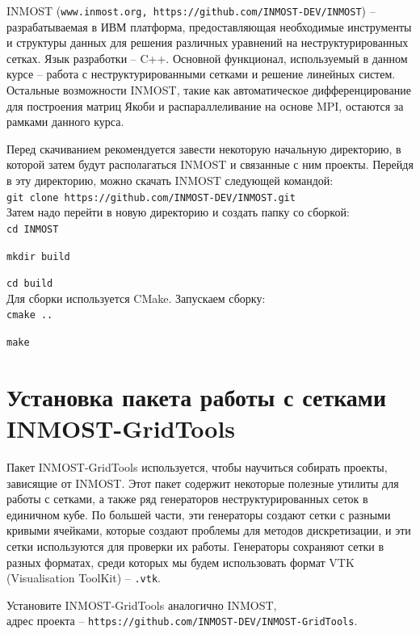 \documentclass[a4paper, 11pt]{article}
\begin{document}
INMOST (\texttt{www.inmost.org, https://github.com/INMOST-DEV/INMOST}) -- разрабатываемая в ИВМ платформа, предоставляющая необходимые инструменты и структуры данных для решения различных уравнений на неструктурированных сетках. Язык разработки -- C++. Основной функционал, используемый в данном курсе -- работа с неструктурированными сетками и решение линейных систем. Остальные возможности INMOST, такие как автоматическое дифференцирование для построения матриц Якоби и распараллеливание на основе MPI, остаются за рамками данного курса.

Перед скачиванием рекомендуется завести некоторую начальную директорию, в которой затем будут располагаться INMOST и связанные с ним проекты. Перейдя в эту директорию, можно скачать INMOST следующей командой:
~\\

\texttt{git clone https://github.com/INMOST-DEV/INMOST.git}
~\\

Затем надо перейти в новую директорию и создать папку со сборкой:
~\\

\texttt{cd INMOST}

\texttt{mkdir build}

\texttt{cd build}
~\\

Для сборки используется CMake. Запускаем сборку:
~\\

\texttt{cmake ..}

\texttt{make}

\section{Установка пакета работы с сетками INMOST-GridTools}
Пакет INMOST-GridTools используется, чтобы научиться собирать проекты, зависящие от INMOST. Этот пакет содержит некоторые полезные утилиты для работы с сетками, а также ряд генераторов неструктурированных сеток в единичном кубе. По большей части, эти генераторы создают сетки с разными кривыми ячейками, которые создают проблемы для методов дискретизации, и эти сетки используются для проверки их работы. Генераторы сохраняют сетки в разных форматах, среди которых мы будем использовать формат VTK (Visualisation ToolKit) -- \texttt{.vtk}.

Установите INMOST-GridTools аналогично INMOST, \\адрес проекта -- \texttt{https://github.com/INMOST-DEV/INMOST-GridTools}.
\end{document}
